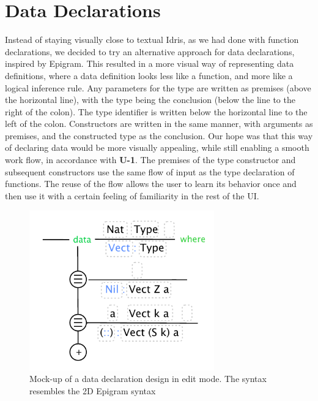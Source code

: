 \section{Data Declarations}
Instead of staying visually close to textual Idris, as we had done with function declarations, we decided to try an alternative approach for data declarations, inspired by Epigram.
This resulted in a more visual way of representing data definitions, where a data definition looks less like a function, and more like a logical inference rule.
Any parameters for the type are written as premises (above the horizontal line), with the type being the conclusion
(below the line to the right of the colon). The type identifier is written
below the horizontal line to the left of the colon.
Constructors are written in the same manner, with arguments as premises, and the constructed type as the conclusion.
Our hope was that this way of declaring data would be more visually appealing, while still enabling a smooth work flow, in accordance with \textbf{U-1}.
The premises of the type constructor and subsequent constructors use the same flow of input as the type declaration of functions.
The reuse of the flow allows the user to learn its behavior once and then use it with a certain feeling of familiarity in the rest of the UI\@.

\begin{figure}
	\centering
		\includegraphics[width=80mm]{diagrams/initial_data_declaration_design.pdf}
	\caption{Mock-up of a data declaration design in edit mode. The syntax
	resembles the 2D Epigram syntax}
\label{fig:initial_data_declaration_design}
\end{figure}


